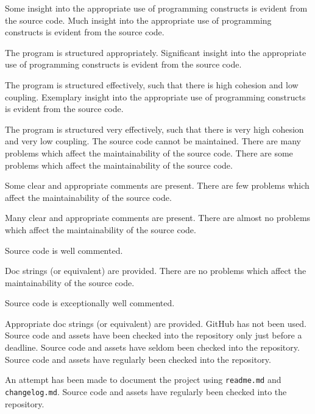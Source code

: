 \documentclass{../fal_assignment}
\begin{document}
\begin{markingrubric}
        \grade 		Some insight into the appropriate use of programming constructs is evident from the source code.
        \grade 		Much insight into the appropriate use of programming constructs is evident from the source code.
        \par 		The program is structured appropriately.
        \grade 		Significant insight into the appropriate use of programming constructs is evident from the source code.
        \par 		The program is structured effectively, such that there is high cohesion and low coupling.
        \grade 		Exemplary insight into the appropriate use of programming constructs is evident from the source code.
        \par 		The program is structured very effectively, such that there is very high cohesion and very low coupling.
%
        \grade\fail 	The source code cannot be maintained.
        \grade 		There are many problems which affect the maintainability of the source code.
        \grade 		There are some problems which affect the maintainability of the source code. 
        \par 		Some clear and appropriate comments are present.
        \grade 		There are few problems which affect the maintainability of the source code. 
        \par 		Many clear and appropriate comments are present.
        \grade 		There are almost no problems which affect the maintainability of the source code. 
        \par 		Source code is well commented.
        \par 		Doc strings (or equivalent) are provided.       
        \grade 		There are no problems which affect the maintainability of the source code.
        \par 		Source code is exceptionally well commented.
        \par 		Appropriate doc strings (or equivalent) are provided. 
%
        \grade\fail 	GitHub has not been used.
        \grade 		Source code and assets have been checked into the repository only just before a deadline.
        \grade 		Source code and assets have seldom been checked into the repository.
        \grade 		Source code and assets have regularly been checked into the repository.
        \par 		An attempt has been made to document the project using \texttt{readme.md} and \texttt{changelog.md}.
        \grade 		Source code and assets have regularly been checked into the repository.

\end{markingrubric}
\end{document}
